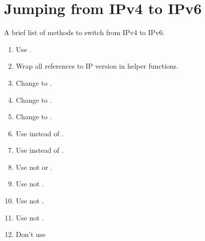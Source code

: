 \section{Jumping from IPv4 to IPv6}
A brief list of methods to switch from IPv4 to IPv6.
\begin{enumerate}
  \item Use .
  \item Wrap all references to IP version in helper functions.
  \item Change  to .
  \item Change  to .
  \item Change  to .
  \item Use  instead of .
  \item Use  instead of .
  \item Use  not  or .
  \item Use  not .
  \item Use  not .
  \item Use  not .
  \item Don't use 
\end{enumerate}